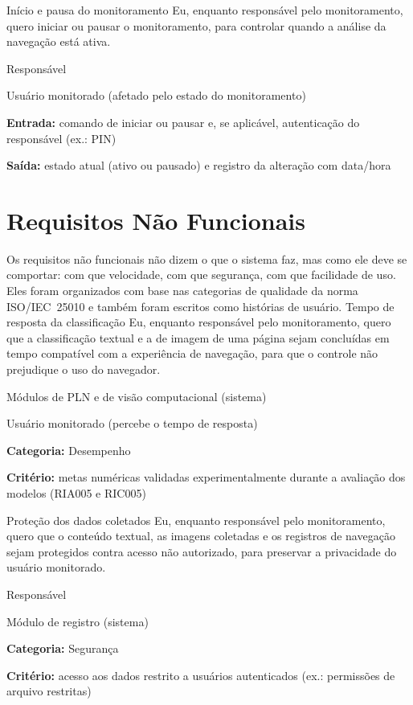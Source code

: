 \documentclass[
    12pt,           %
    oneside,        %
    a4paper,        %
    chapter=TITLE,  %
    english,        %
    brazil          %
]{abntex2}
\begin{document}
{Início e pausa do monitoramento}
{Eu, enquanto responsável pelo monitoramento, quero iniciar ou pausar o monitoramento, para controlar quando a análise da navegação está ativa.}
{\begin{dadoslista}
\item Responsável
\item Usuário monitorado (afetado pelo estado do monitoramento)
\end{dadoslista}}
{\begin{dadoslista}
\item \textbf{Entrada:} comando de iniciar ou pausar e, se aplicável, autenticação do responsável (ex.: PIN)
\item \textbf{Saída:} estado atual (ativo ou pausado) e registro da alteração com data/hora
\end{dadoslista}}

\section{Requisitos Não Funcionais}

Os requisitos não funcionais não dizem o que o sistema faz, mas como ele deve
se comportar: com que velocidade, com que segurança, com que facilidade de
uso. Eles foram organizados com base nas categorias de qualidade da norma
ISO/IEC~25010 \cite{iso25010} e também foram escritos como histórias de
usuário.
{Tempo de resposta da classificação}
{Eu, enquanto responsável pelo monitoramento, quero que a classificação textual e a de imagem de uma página sejam concluídas em tempo compatível com a experiência de navegação, para que o controle não prejudique o uso do navegador.}
{\begin{dadoslista}
\item Módulos de PLN e de visão computacional (sistema)
\item Usuário monitorado (percebe o tempo de resposta)
\end{dadoslista}}
{\begin{dadoslista}
\item \textbf{Categoria:} Desempenho
\item \textbf{Critério:} metas numéricas validadas experimentalmente durante a avaliação dos modelos (RIA005 e RIC005)
\end{dadoslista}}

{Proteção dos dados coletados}
{Eu, enquanto responsável pelo monitoramento, quero que o conteúdo textual, as imagens coletadas e os registros de navegação sejam protegidos contra acesso não autorizado, para preservar a privacidade do usuário monitorado.}
{\begin{dadoslista}
\item Responsável
\item Módulo de registro (sistema)
\end{dadoslista}}
{\begin{dadoslista}
\item \textbf{Categoria:} Segurança
\item \textbf{Critério:} acesso aos dados restrito a usuários autenticados (ex.: permissões de arquivo restritas)
\end{dadoslista}}
\end{document}
